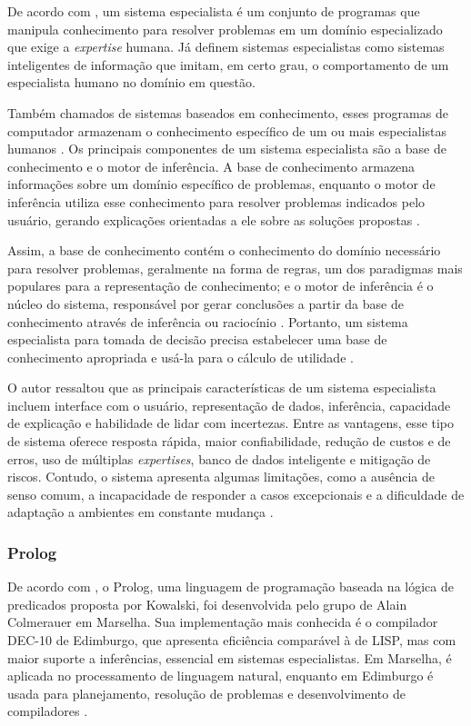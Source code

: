 De acordo com \textcite{jimmysingla}, um sistema especialista é um conjunto de programas que manipula conhecimento para resolver problemas em um domínio especializado que exige a \textit{expertise} humana. Já \textcite{markobohanec} definem sistemas especialistas como sistemas inteligentes de informação que imitam, em certo grau, o comportamento de um especialista humano no domínio em questão.

Também chamados de sistemas baseados em conhecimento, esses programas de computador armazenam o conhecimento específico de um ou mais especialistas humanos \cite{jimmysingla}. Os principais componentes de um sistema especialista são a base de conhecimento e o motor de inferência. A base de conhecimento armazena informações sobre um domínio específico de problemas, enquanto o motor de inferência utiliza esse conhecimento para resolver problemas indicados pelo usuário, gerando explicações orientadas a ele sobre as soluções propostas \cite{markobohanec}. 

Assim, a base de conhecimento contém o conhecimento do domínio necessário para resolver problemas, geralmente na forma de regras, um dos paradigmas mais populares para a representação de conhecimento; e o motor de inferência é o núcleo do sistema, responsável por gerar conclusões a partir da base de conhecimento através de inferência ou raciocínio \cite{jimmysingla}. Portanto, um sistema especialista para tomada de decisão precisa estabelecer uma base de conhecimento apropriada e usá-la para o cálculo de utilidade \cite{markobohanec}.

O autor \textcite{jimmysingla} ressaltou que as principais características de um sistema especialista incluem interface com o usuário, representação de dados, inferência, capacidade de explicação e habilidade de lidar com incertezas. Entre as vantagens, esse tipo de sistema oferece resposta rápida, maior confiabilidade, redução de custos e de erros, uso de múltiplas \textit{expertises}, banco de dados inteligente e mitigação de riscos. Contudo, o sistema apresenta algumas limitações, como a ausência de senso comum, a incapacidade de responder a casos excepcionais e a dificuldade de adaptação a ambientes em constante mudança \cite{jimmysingla}. 

\subsubsection{Prolog}

De acordo com \textcite{keithclark}, o Prolog, uma linguagem de programação baseada na lógica de predicados proposta por Kowalski, foi desenvolvida pelo grupo de Alain Colmerauer em Marselha. Sua implementação mais conhecida é o compilador DEC-10 de Edimburgo, que apresenta eficiência comparável à de LISP, mas com maior suporte a inferências, essencial em sistemas especialistas. Em Marselha, é aplicada no processamento de linguagem natural, enquanto em Edimburgo é usada para planejamento, resolução de problemas e desenvolvimento de compiladores \cite{keithclark}.

